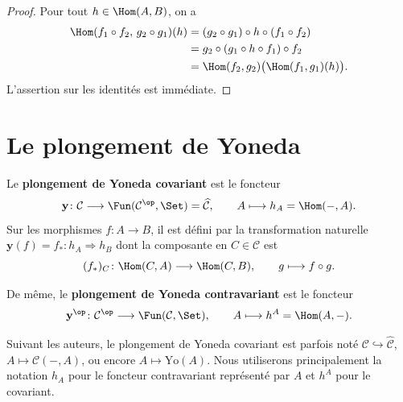 \begin{proof}
Pour tout $h \in \Hom(A, B)$, on a
\begin{align*}
    \Hom(f_1 \circ f_2,\, g_2 \circ g_1)(h)
    &= (g_2 \circ g_1) \circ h \circ (f_1 \circ f_2) \\
    &= g_2 \circ (g_1 \circ h \circ f_1) \circ f_2 \\
    &= \Hom(f_2, g_2)\bigl(\Hom(f_1, g_1)(h)\bigr).
\end{align*}
L'assertion sur les identités est immédiate.
\end{proof}


\section{Le plongement de Yoneda}\label{sec:plongement-yoneda}

\begin{definition}\label{def:plongement-yoneda-cov}
Le \textbf{plongement de Yoneda covariant} est le foncteur
\[
    \mathbf{y} \colon \mathcal{C} \longrightarrow \Fun(\mathcal{C}^{\op}, \Set)
    = \widehat{\mathcal{C}}, \qquad
    A \longmapsto h_A = \Hom(-, A).
\]
Sur les morphismes $f \colon A \to B$, il est défini par la transformation
naturelle $\mathbf{y}(f) = f_* \colon h_A \Rightarrow h_B$ dont la composante
en $C \in \mathcal{C}$ est
\[
    (f_*)_C \colon \Hom(C, A) \longrightarrow \Hom(C, B), \qquad
    g \longmapsto f \circ g.
\]
\end{definition}

\begin{definition}\label{def:plongement-yoneda-contrav}
De même, le \textbf{plongement de Yoneda contravariant} est le foncteur
\[
    \mathbf{y}^{\op} \colon \mathcal{C}^{\op} \longrightarrow
    \Fun(\mathcal{C}, \Set), \qquad
    A \longmapsto h^A = \Hom(A, -).
\]
\end{definition}

\begin{remarque}\label{rem:yoneda-notations}
Suivant les auteurs, le plongement de Yoneda covariant est parfois noté
$\mathcal{C} \hookrightarrow \widehat{\mathcal{C}}$,
$A \mapsto \mathcal{C}(-, A)$, ou encore $A \mapsto \mathrm{Yo}(A)$.
Nous utiliserons principalement la notation $h_A$ pour le foncteur
contravariant représenté par $A$ et $h^A$ pour le covariant.
\end{remarque}

